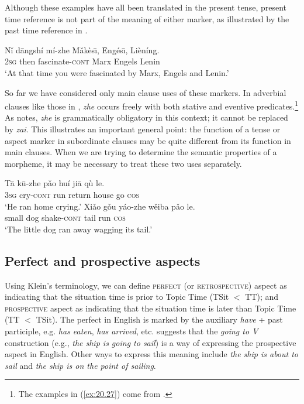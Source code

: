 Although these examples have all been translated in the present tense, present time reference is not part of the meaning of either marker, as illustrated by the past time reference in .


\ea \label{ex:20.26}
\gll Nǐ  dāngshí  mí-zhe  Mǎkès\={\i},  \=Engés\={\i},  Lièníng.\\
\textsc{2sg}  then  fascinate-\textsc{cont}  Marx  Engels  Lenin\\
\glt ‘At that time you were fascinated by Marx, Engels and Lenin.’ 
\z


So far we have considered only main clause uses of these markers. In adverbial clauses like those in , \textit{zhe} occurs freely with both stative and eventive predicates.\footnote{The examples in (\ref{ex:20.27}) come from \citet[223]{LiThompson1981}.} As \citet[275]{Smith1997} notes, \textit{zhe} is grammatically obligatory in this context; it cannot be replaced by \textit{zai}. This illustrates an important general point: the function of a tense or aspect marker in subordinate clauses may be quite different from its function in main clauses. When we are trying to determine the semantic properties of a morpheme, it may be necessary to treat these two uses separately.


\ea \label{ex:20.27}
\ea  \gll Tā  k\=u-zhe  pǎo  huí  jiā  qù  le.\\
\textsc{3sg}  cry-\textsc{cont}  run  return  house  go  \textsc{cos}\\
\glt ‘He ran home crying.’ 
\ex \gll  Xiǎo  gǒu  yáo-zhe  wěiba  pǎo  le.\\
small  dog  shake-\textsc{cont}  tail  run  \textsc{cos}\\
\glt ‘The little dog ran away wagging its tail.’ 
\z \z

\subsection{Perfect and prospective aspects}\label{sec:20.4.3}

Using Klein’s terminology, we can define \textsc{perfect} (or \textsc{retrospective}) aspect as indicating that the situation time is prior to Topic Time (TSit ${<}$ TT); and \textsc{prospective} aspect as indicating that the situation time is later than Topic Time (TT ${<}$ TSit). The perfect in English is marked by the auxiliary \textit{have} + past participle, e.g. \textit{has eaten}, \textit{has arrived}, etc. \citet[64]{Comrie1976} suggests that the \textit{going to V} construction (e.g., \textit{the ship is going to sail}) is a way of expressing the prospective aspect in English. Other ways to express this meaning include \textit{the ship is about to sail} and \textit{the ship is on the point of sailing}.



